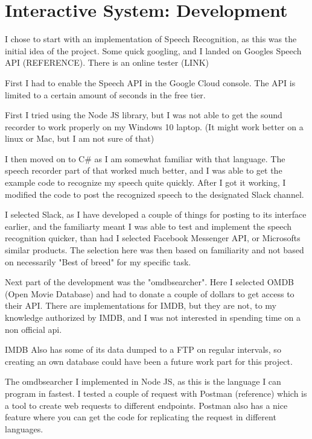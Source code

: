 \documentclass[11pt,fleqn]{book} %
\begin{document}

\chapter{Interactive System: Development}
I chose to start with an implementation of Speech Recognition, as this was the initial idea of the project.
Some quick googling, and I landed on Googles Speech API (REFERENCE). There is an online tester (LINK)

First I had to enable the Speech API in the Google Cloud console. The API is limited to a certain amount of seconds in the free tier.

First I tried using the Node JS library, but I was not able to get the sound recorder to work properly on my Windows 10 laptop. (It might work better on a linux or Mac, but I am not sure of that)

I then moved on to C# as I am somewhat familiar with that language. The speech recorder part of that worked much better, and I was able to get the example code to recognize my speech quite quickly.
After I got it working, I modified the code to post the recognized speech to the designated Slack channel.

I selected Slack, as I have developed a couple of things for posting to its interface earlier, and the familiarty meant I was able to test and implement the speech recognition quicker, than had I selected Facebook Messenger API, or Microsofts similar products.
The selection here was then based on familiarity and not based on necessarily "Best of breed" for my specific task.

Next part of the development was the "omdbsearcher". Here I selected OMDB (Open Movie Database) and had to donate a couple of dollars to get access to their API. There are implementations for IMDB, but they are not, to my knowledge authorized by IMDB, and I was not interested in spending time on a non official api.

IMDB Also has some of its data dumped to a FTP on regular intervals, so creating an own database could have been a future work part for this project.

The omdbsearcher I implemented in Node JS, as this is the language I can program in fastest. I tested a couple of request with Postman (reference) which is a tool to create web requests to different endpoints. Postman also has a nice feature where you can get the code for replicating the request in different languages.
\end{document}
